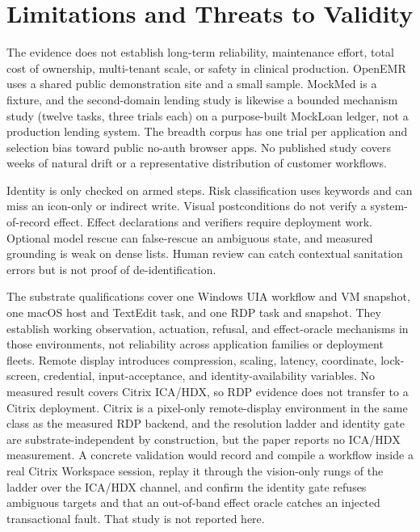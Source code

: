 \section{Limitations and Threats to Validity}

The evidence does not establish long-term reliability, maintenance effort,
total cost of ownership, multi-tenant scale, or safety in clinical production.
OpenEMR uses a shared public demonstration site and a small sample. MockMed is a
fixture, and the second-domain lending study is likewise a bounded mechanism
study (twelve tasks, three trials each) on a purpose-built MockLoan ledger, not a
production lending system. The breadth corpus has one trial per application and
selection bias toward public no-auth browser apps. No published study covers
weeks of natural drift or a representative distribution of customer workflows.

Identity is only checked on armed steps. Risk classification uses keywords and
can miss an icon-only or indirect write. Visual postconditions do not verify a
system-of-record effect. Effect declarations and verifiers require deployment
work. Optional model rescue can false-rescue an ambiguous state, and measured
grounding is weak on dense lists. Human review can catch contextual sanitation
errors but is not proof of de-identification.

The substrate qualifications cover one Windows UIA workflow and VM snapshot,
one macOS host and TextEdit task, and one RDP task and snapshot. They establish
working observation, actuation, refusal, and effect-oracle mechanisms in those
environments, not reliability across application families or deployment fleets.
Remote display introduces compression, scaling, latency, coordinate,
lock-screen, credential, input-acceptance, and identity-availability variables.
No measured result covers Citrix ICA/HDX, so RDP evidence does not transfer to a
Citrix deployment. Citrix is a pixel-only remote-display environment in the same
class as the measured RDP backend, and the resolution ladder and identity gate
are substrate-independent by construction, but the paper reports no ICA/HDX
measurement. A concrete validation would record and compile a workflow inside a
real Citrix Workspace session, replay it through the vision-only rungs of the
ladder over the ICA/HDX channel, and confirm the identity gate refuses ambiguous
targets and that an out-of-band effect oracle catches an injected transactional
fault. That study is not reported here.

